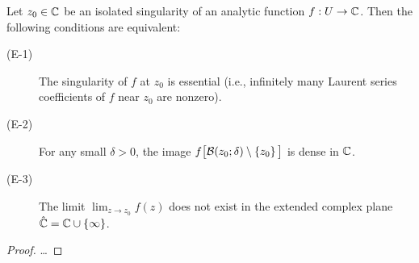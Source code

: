 
\begin{theorem}
  \label{thm:essential_singularity}
  Let $z_0 \in \mathbb{C}$ be an isolated singularity of
  an analytic function $f : U \to \mathbb{C}$.
  Then the following conditions are equivalent:
  \begin{description}
    \item[(E-1)] The singularity of $f$ at $z_0$ is essential (i.e.,
      infinitely many Laurent series coefficients of $f$ near $z_0$ are nonzero).
    \item[(E-2)] For any small $\delta > 0$, the image
      $f \big[ \mathcal{B}(z_0; \delta) \setminus \left\{ z_0 \right\} \big]$ is dense in $\mathbb{C}$.
    \item[(E-3)] The limit $\lim_{z \to z_0} f(z)$ does not exist
      in the extended complex plane $\hat{\mathbb{C}} = \mathbb{C} \cup \left\{ \infty \right\}$.
  \end{description}
\end{theorem}
\begin{proof}
  \ldots
\end{proof}




